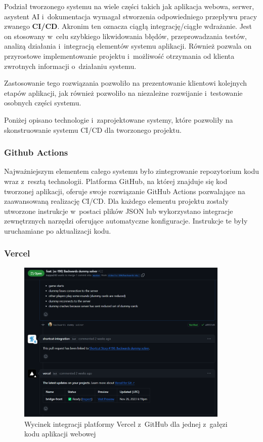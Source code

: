 Podział tworzonego systemu na wiele części
takich jak aplikacja webowa, serwer, asystent AI
i~dokumentacja wymagał stworzenia odpowiedniego
przepływu pracy zwanego \textbf{CI/CD}. Akronim ten oznacza
ciągłą integrację/ciągłe wdrażanie. Jest on stosowany
w~celu szybkiego likwidowania błędów, przeprowadzania
testów, analizą działania i~integracją elementów systemu
aplikacji. Również pozwala on przyrostowe implementowanie
projektu i~możliwość otrzymania od klienta zwrotnych
informacji o~działaniu systemu.

Zastosowanie tego rozwiązania pozwoliło na
prezentowanie klientowi kolejnych etapów aplikacji, jak
również pozwoliło na niezależne rozwijanie
i~testowanie osobnych części systemu.

Poniżej opisano technologie i~zaprojektowane systemy,
które pozwoliły na skonstruowanie systemu CI/CD dla
tworzonego projektu.


\subsubsection{Github Actions}

Najważniejszym elementem całego systemu było zintegrowanie
repozytorium kodu
wraz z~resztą technologii. Platforma GitHub, na której
znajduje się kod tworzonej aplikacji, oferuje swoje
rozwiązanie GitHub Actions\cite{GithubActions} pozwalające
na zaawansowaną realizację CI/CD. Dla każdego elementu
projektu zostały utworzone instrukcje w~postaci plików JSON
lub wykorzystano integracje zewnętrznych narzędzi oferujące
automatyczne konfiguracje. Instrukcje te były uruchamiane
po aktualizacji kodu.


\subsubsection{Vercel}

\begin{figure}[!]
    \centering
    \includegraphics[width=0.9\textwidth]{img/github/github-vercel.png}
    \caption{Wycinek integracji platformy Vercel z~GitHub dla jednej z~gałęzi kodu aplikacji webowej}
    \label{fig:github-vercel}
\end{figure}

